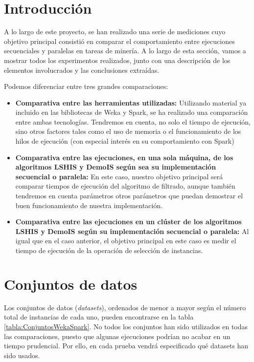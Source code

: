 \label{anexo:Pruebas}

\section{Introducción}

A lo largo de este proyecto, se han realizado una serie de mediciones cuyo objetivo principal consistió en comparar el comportamiento entre ejecuciones secuenciales y paralelas en tareas de minería. A lo largo de esta sección, vamos a mostrar todos los experimentos realizados, junto con una descripción de los elementos involucrados y las conclusiones extraídas.

Podemos diferenciar entre tres grandes comparaciones:

\begin{itemize}
	\item \textbf{Comparativa entre las herramientas utilizadas:} Utilizando material ya incluido en las bibliotecas de Weka y Spark, se ha realizado una comparación entre ambas tecnologías. Tendremos en cuenta, no solo el tiempo de ejecución, sino otros factores tales como el uso de memoria o el funcionamiento de los hilos de ejecución (con especial interés en su comportamiento con Spark)
	\item \textbf{Comparativa entre las ejecuciones, en una sola máquina, de los algoritmos LSHIS y DemoIS según sea su implementación secuencial o paralela:} En este caso, nuestro objetivo principal será comparar tiempos de ejecución del algoritmo de filtrado, aunque también tendremos en cuenta parámetros otros parámetros que puedan demostrar el buen funcionamiento de nuestra implementación.
	\item \textbf{Comparativa entre las ejecuciones en un clúster de los algoritmos LSHIS y DemoIS según su implementación secuencial o paralela:} Al igual que en el caso anterior, el objetivo principal en este caso es medir el tiempo de ejecución de la operación de selección de instancias.

\end{itemize} 

\section{Conjuntos de datos}\label{sec:ConjuntosDeDatos}

Los conjuntos de datos (\textit{datasets}), ordenados de menor a mayor según el número total de instancias de cada uno, pueden encontrarse en la tabla \ref{tabla:ConjuntosWekaSpark}. No todos los conjuntos han sido utilizados en todas las comparaciones, puesto que  algunas ejecuciones podrían no acabar en un tiempo prudencial. Por ello, en cada prueba vendrá especificado qué datasets han sido usados.

